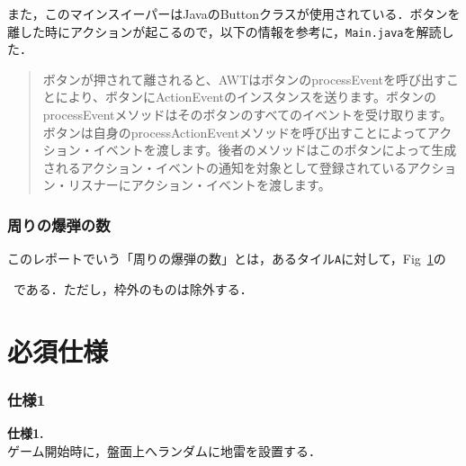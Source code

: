 \documentclass[a4j,11pt]{jsarticle}
\newcommand{\figref}[1]{Fig\ \ref{#1}}
\begin{document}
また，このマインスイーパーはJavaのButtonクラスが使用されている．ボタンを離した時にアクションが起こるので，以下の情報を参考に，\verb|Main.java|を解読した．
\begin{quote}
    ボタンが押されて離されると、AWTはボタンのprocessEventを呼び出すことにより、ボタンにActionEventのインスタンスを送ります。ボタンのprocessEventメソッドはそのボタンのすべてのイベントを受け取ります。ボタンは自身のprocessActionEventメソッドを呼び出すことによってアクション・イベントを渡します。後者のメソッドはこのボタンによって生成されるアクション・イベントの通知を対象として登録されているアクション・リスナーにアクション・イベントを渡します。\\\hfill{\cite{label1}}
\end{quote}
\section*{周りの爆弾の数}
このレポートでいう「周りの爆弾の数」とは，あるタイル\verb|A|に対して，\figref{fig:周りの爆弾}の\ \ である．ただし，枠外のものは除外する．
\begin{figure}[h]
    \centering
    \caption{}
    \label{fig:周りの爆弾}
\end{figure}
\newpage
\part{必須仕様}
\section*{仕様1}
\setcounter{section}{1}
\begin{screen}
    \textbf{仕様1.}\\
    ゲーム開始時に，盤面上へランダムに地雷を設置する．
\end{screen}
\end{document}
